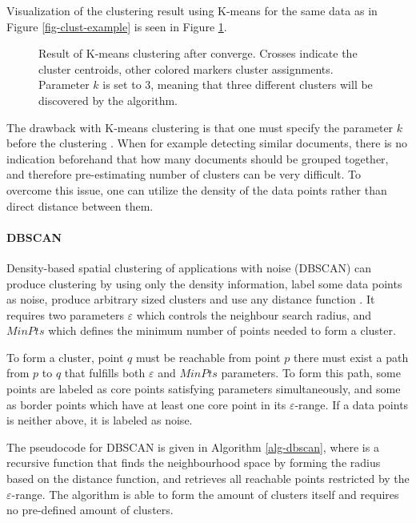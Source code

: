 \noindent 
Visualization of the clustering result using K-means for the same data as in Figure \ref{fig-clust-example} is seen in Figure \ref{fig-kmeans-example}.

\begin{figure}[!h]
\centering
\setlength\figureheight{7cm}
\setlength\figurewidth{7cm}

\caption{Result of K-means clustering after converge. Crosses indicate the cluster centroids, other colored markers cluster assignments. Parameter $k$ is set to 3, meaning that three different clusters will be discovered by the algorithm.} \label{fig-kmeans-example}
\end{figure}


The drawback with K-means clustering is that one must specify the parameter $k$ before the clustering \cite{hastie_09_elements-of.statistical-learning}. When for example detecting similar documents, there is no indication beforehand that how many documents should be grouped together, and therefore pre-estimating number of clusters can be very difficult. To overcome this issue, one can utilize the density of the data points rather than direct distance between them.

\paragraph{DBSCAN}

Density-based spatial clustering of applications with noise (DBSCAN) can produce clustering by using only the density information, label some data points as noise, produce arbitrary sized clusters and use any distance function \cite{Ester:1996:DAD:3001460.3001507}. It requires two parameters $\varepsilon$ which controls the neighbour search radius, and $MinPts$ which defines the minimum number of points needed to form a cluster. 

To form a cluster, point $q$ must be reachable from point $p$ \ie there must exist a path from $p$ to $q$ that fulfills both $\varepsilon$ and $MinPts$ parameters. To form this path, some points are labeled as core points satisfying parameters simultaneously, and some as border points which have at least one core point in its $\varepsilon$-range. If a data points is neither above, it is labeled as noise.


The pseudocode for DBSCAN is given in Algorithm \ref{alg-dbscan}, where  is a recursive function that finds the neighbourhood space by forming the radius based on the distance function, and retrieves all reachable points restricted by the $\varepsilon$-range. The algorithm is able to form the amount of clusters itself and requires no pre-defined amount of clusters.

